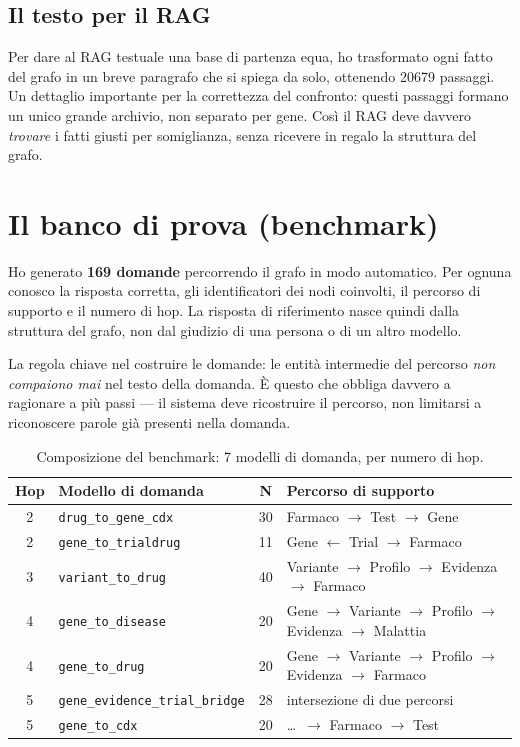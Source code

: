 \documentclass[11pt,a4paper]{report}
\begin{document}
\subsection{Il testo per il RAG}

Per dare al RAG testuale una base di partenza equa, ho trasformato ogni
fatto del grafo in un breve paragrafo che si spiega da solo, ottenendo
\num{20679} passaggi. Un dettaglio importante per la correttezza del
confronto: questi passaggi formano un unico grande archivio, non separato
per gene. Così il RAG deve davvero \emph{trovare} i fatti giusti per
somiglianza, senza ricevere in regalo la struttura del grafo.

\section{Il banco di prova (benchmark)}

Ho generato \textbf{169 domande} percorrendo il grafo in modo automatico.
Per ognuna conosco la risposta corretta, gli identificatori dei nodi
coinvolti, il percorso di supporto e il numero di hop. La risposta di
riferimento nasce quindi dalla struttura del grafo, non dal giudizio di
una persona o di un altro modello.

La regola chiave nel costruire le domande: le entità intermedie del
percorso \emph{non compaiono mai} nel testo della domanda. È questo che
obbliga davvero a ragionare a più passi --- il sistema deve ricostruire il
percorso, non limitarsi a riconoscere parole già presenti nella domanda.

\begin{table}[H]
\centering
\caption{Composizione del benchmark: 7 modelli di domanda, per numero di hop.}
\label{tab:benchmark}
\begin{tabular}{clcl}
\toprule
\textbf{Hop} & \textbf{Modello di domanda} & \textbf{N} & \textbf{Percorso di supporto} \\
\midrule
2 & \texttt{drug\_to\_gene\_cdx}          & 30 & Farmaco $\to$ Test $\to$ Gene \\
2 & \texttt{gene\_to\_trialdrug}          & 11 & Gene $\leftarrow$ Trial $\to$ Farmaco \\
3 & \texttt{variant\_to\_drug}            & 40 & Variante $\to$ Profilo $\to$ Evidenza $\to$ Farmaco \\
4 & \texttt{gene\_to\_disease}            & 20 & Gene $\to$ Variante $\to$ Profilo $\to$ Evidenza $\to$ Malattia \\
4 & \texttt{gene\_to\_drug}               & 20 & Gene $\to$ Variante $\to$ Profilo $\to$ Evidenza $\to$ Farmaco \\
5 & \texttt{gene\_evidence\_trial\_bridge}& 28 & intersezione di due percorsi \\
5 & \texttt{gene\_to\_cdx}                & 20 & \dots\ $\to$ Farmaco $\to$ Test \\
\bottomrule
\end{tabular}
\end{table}
\end{document}
